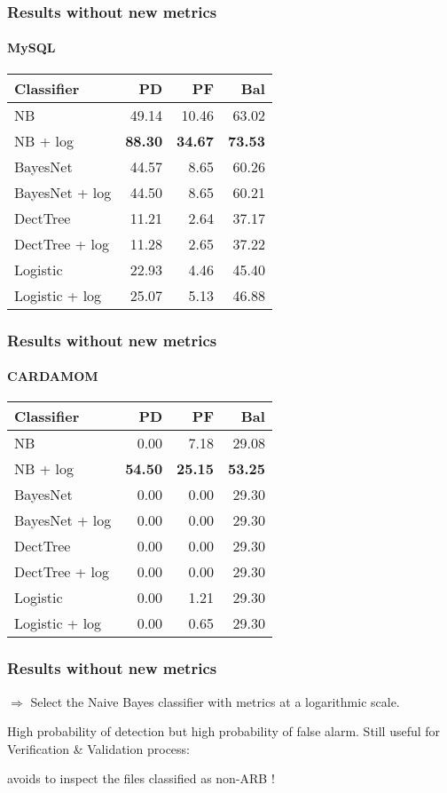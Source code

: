 \begin{frame}
 \frametitle{Results without new metrics}
 \framesubtitle{MySQL}
 \begin{center}
 \begin{tabular}{lrrr}
  \hspace{0.2cm} Classifier & PD & PF & Bal\\
  \hline
  NB & 49.14 & 10.46 & 63.02\\
  NB + log &  \textbf{88.30} & \textbf{34.67} & \textbf{73.53}\\
  BayesNet & 44.57 & 8.65 & 60.26\\
  BayesNet + log & 44.50 & 8.65 & 60.21\\
  DectTree & 11.21 & 2.64 & 37.17\\
  DectTree + log & 11.28 & 2.65 & 37.22\\
  Logistic & 22.93 & 4.46 & 45.40\\
  Logistic + log & 25.07 & 5.13 & 46.88\\
  \hline
 \end{tabular}
 \end{center}
\end{frame}

\begin{frame}
 \frametitle{Results without new metrics}
 \framesubtitle{CARDAMOM}
 \begin{center}
 \begin{tabular}{lrrr}
  \hspace{0.2cm} Classifier & PD & PF & Bal\\
  \hline
  NB & 0.00 & 7.18 & 29.08\\
  NB + log &  \textbf{54.50} & \textbf{25.15} & \textbf{53.25}\\
  BayesNet & 0.00 & 0.00 & 29.30\\
  BayesNet + log & 0.00 & 0.00 & 29.30\\
  DectTree & 0.00 & 0.00 & 29.30\\
  DectTree + log & 0.00 & 0.00 & 29.30\\
  Logistic & 0.00 & 1.21 & 29.30\\
  Logistic + log & 0.00 & 0.65 & 29.30\\
  \hline
 \end{tabular}
 \end{center}
\end{frame}

\begin{frame}
 \frametitle{Results without new metrics}
 \begin{center}
  $\Longrightarrow$ \alert{Select the Naive Bayes classifier with metrics at a logarithmic scale.}
 \end{center}
 \vspace{1cm}
 High probability of detection but high probability of false alarm.
 Still useful for Verification \& Validation process:
 \begin{center}
  \alert{avoids to inspect the files classified as non-ARB !}
 \end{center}
\end{frame}